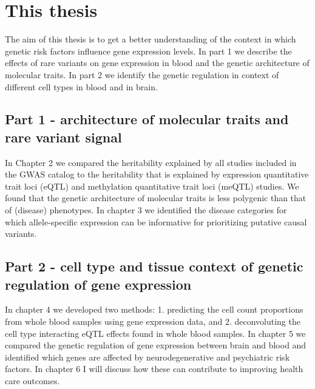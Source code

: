 \section{This thesis}
The aim of this thesis is to get a better understanding of the context in which genetic risk factors influence gene expression levels. In part 1 we describe the effects of rare variants on gene expression in blood and the genetic architecture of molecular traits. In part 2 we identify the genetic regulation in context of different cell types in blood and in brain.

\subsection{Part 1 - architecture of molecular traits and rare variant signal}
In Chapter 2 we compared the heritability explained by all studies included in the GWAS catalog\cite{bunielloNHGRIEBIGWASCatalog2019} to the heritability that is explained by expression quantitative trait loci (eQTL) and methylation quantitative trait loci (meQTL) studies. We found that the genetic architecture of molecular traits is less polygenic than that of (disease) phenotypes. In chapter 3 we identified the disease categories for which allele-specific expression can be informative for prioritizing putative causal variants.

\subsection{Part 2 - cell type and tissue context of genetic regulation of gene expression}
In chapter 4 we developed two methods: 1. predicting the cell count proportions from whole blood samples using gene expression data, and 2. deconvoluting the cell type interacting eQTL effects found in whole blood samples. In chapter 5 we compared the genetic regulation of gene expression between brain and blood and identified which genes are affected by neurodegenerative and psychiatric risk factors. In chapter 6 I will discuss how these can contribute to improving health care outcomes.




